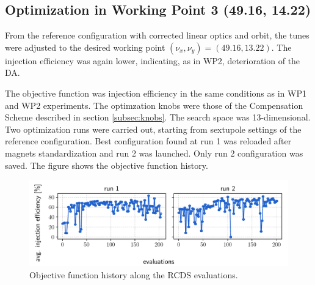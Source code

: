 \subsection{Optimization in Working Point 3 (49.16, 14.22)}
From the reference configuration with corrected linear optics and orbit, the tunes were adjusted to the desired working point $(\nu_x, \nu_y)=(49.16, 13.22)$. The injection efficiency was again lower, indicating, as in WP2, deterioration of the DA.

The objective function was injection efficiency in the same conditions as in WP1 and WP2 experiments. The optimzation knobs were those of the Compensation Scheme described in section \ref{subsec:knobs}. The search space was 13-dimensional. Two optimization runs were carried out, starting from sextupole settings of the reference configuration. Best configuration found at run 1 was reloaded after magnets standardization and run 2 was launched. Only run 2 configuration was saved. The figure shows the objective function history.
\begin{figure}[tb]
    \centering
    \includegraphics[width=\columnwidth]{Images/wp3_objfunc_hist.pdf}
    \caption{Objective function history along the RCDS evaluations.}
\end{figure}
